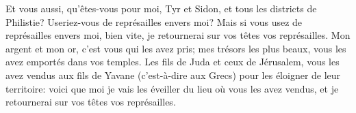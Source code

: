 Et vous aussi, qu’êtes-vous pour moi, Tyr et Sidon,
	et tous les districts de Philistie?
	Useriez-vous de représailles envers moi?
Mais si vous usez de représailles envers moi,
	bien vite, je retournerai sur vos têtes vos représailles.
Mon argent et mon or, c’est vous qui les avez pris;
	mes trésors les plus beaux, vous les avez emportés dans vos temples.
Les fils de Juda et ceux de Jérusalem,
	vous les avez vendus aux fils de Yavane (c’est-à-dire aux Grecs)
	pour les éloigner de leur territoire:
	voici que moi je vais les éveiller du lieu où vous les avez vendus,
	et je retournerai sur vos têtes vos représailles.
